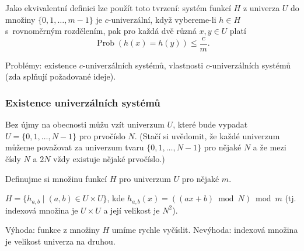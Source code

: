 \documentclass[a4paper,12pt]{article}
\DeclareMathOperator*{\Prob}{Prob}
\begin{document}
Jako ekvivalentní definici lze použít toto tvrzení: systém funkcí $
H$ z univerza $U$ do množiny $\{0,1,\dots,m-1\}$ je $c$-univerzální,
když vybereme-li $h\in H$ s~rovnoměrným rozděle\-ním, pak pro 
každá dvě různá $x,y\in U$ platí 
$$\Prob(h(x)=h(y))\le\frac cm.$$

Problémy: existence $c$-univerzálních 
systémů, \newline 
vlastnosti $c$-univerzálních systémů (zda splňují 
požadované ide\-je).

\subsubsection{Existence univerzálních systémů}
Bez újmy na obecnosti můžu vzít univerzum $U$, které bude vypadat $U=\{0,1,\dots,N-1\}$ pro prvočíslo $N$. (Stačí si uvědomit, že  každé univerzum můžeme 
považovat za univerzum tvaru $\{0,1,\dots,N-1\}$ pro nějaké 
$N$ a že mezi čísly $N$ a $2N$ vždy existuje nějaké 
prvočíslo.)

Definujme si množinu funkcí $H$ pro univerzum $U$ pro nějaké $m$.

\begin{definice}
$H=\{h_{a,b}\mid (a,b)\in U\times U\}$, 
kde $h_{a,b}(x)=((ax+b)\bmod N)\bmod m$ 
(tj. indexová množina je $U\times U$ a její velikost je $
N^2$).
\end{definice}

Výhoda: funkce z množiny $H$ umíme rychle 
vyčíslit. Nevýhoda: indexová množina je velikost univerza na druhou.
\end{document}
